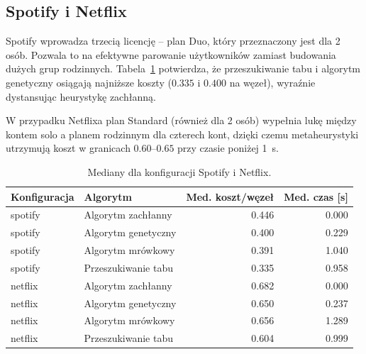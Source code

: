 \subsection{Spotify i Netflix}

Spotify wprowadza trzecią licencję -- plan Duo, który przeznaczony jest dla 2 osób. Pozwala to na efektywne parowanie użytkowników zamiast budowania dużych grup rodzinnych. Tabela~\ref{tab:ext-additional-static} potwierdza, że przeszukiwanie tabu i algorytm genetyczny osiągają najniższe koszty ($0.335$ i $0.400$ na węzeł), wyraźnie dystansując heurystykę zachłanną.

W przypadku Netflixa plan Standard (również dla 2 osób) wypełnia lukę między kontem solo a planem rodzinnym dla czterech kont, dzięki czemu metaheurystyki utrzymują koszt w granicach $0.60$--$0.65$ przy czasie poniżej 1~s.

\begin{table}[H]
  \centering
  \caption{Mediany dla konfiguracji Spotify i Netflix.}
  \label{tab:ext-additional-static}
  \begin{tabular}{llrr}
    \toprule
    \textbf{Konfiguracja} & \textbf{Algorytm}   & \textbf{Med. koszt/węzeł} & \textbf{Med. czas [s]} \\
    \midrule
    spotify               & Algorytm zachłanny  & 0.446                     & 0.000                  \\
    spotify               & Algorytm genetyczny & 0.400                     & 0.229                  \\
    spotify               & Algorytm mrówkowy   & 0.391                     & 1.040                  \\
    spotify               & Przeszukiwanie tabu & 0.335                     & 0.958                  \\
    netflix               & Algorytm zachłanny  & 0.682                     & 0.000                  \\
    netflix               & Algorytm genetyczny & 0.650                     & 0.237                  \\
    netflix               & Algorytm mrówkowy   & 0.656                     & 1.289                  \\
    netflix               & Przeszukiwanie tabu & 0.604                     & 0.999                  \\
  \end{tabular}
\end{table}


